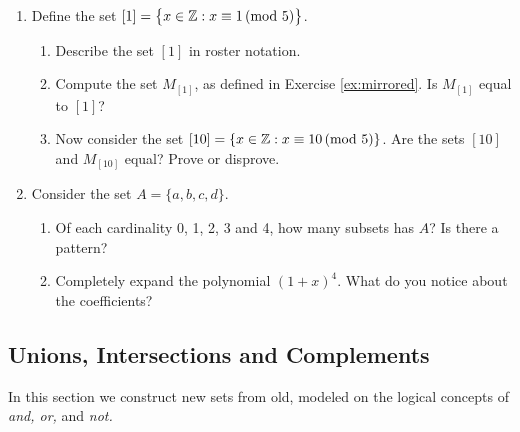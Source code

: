 \begin{exercises}{}{}
\begin{enumerate}
  \item Define the set $[1]=\bigl\{x\in\mathbb{Z}: x\equiv 1\negthickspace\pmod{5}\bigr\}$.
		\begin{enumerate}
		  \item Describe the set $[1]$ in roster notation.
		  \item Compute the set $M_{[1]}$, as defined in Exercise \ref{ex:mirrored}. Is $M_{[1]}$ equal to $[1]$?
			\item Now consider the set $[10]=\{x\in\mathbb{Z}:x\equiv 10\negthickspace\pmod{5}\}$. Are the sets $[10]$ and $M_{[10]}$ equal? Prove or disprove.
  	\end{enumerate}


    

		\item Consider the set $A=\{a,b,c,d\}$. 
    \begin{enumerate}
      \item Of each cardinality 0, 1, 2, 3 and 4, how many subsets has $A$? Is there a pattern?
        
      \item Completely expand the polynomial $(1 + x)^4$. What do you notice about the coefficients? 
    \end{enumerate}

	\end{enumerate}
\end{exercises}

\clearpage



\subsection{Unions, Intersections and Complements}\label{sec:union}

In this section we construct new sets from old, modeled on the logical concepts of \emph{and, or,} and \emph{not.}


